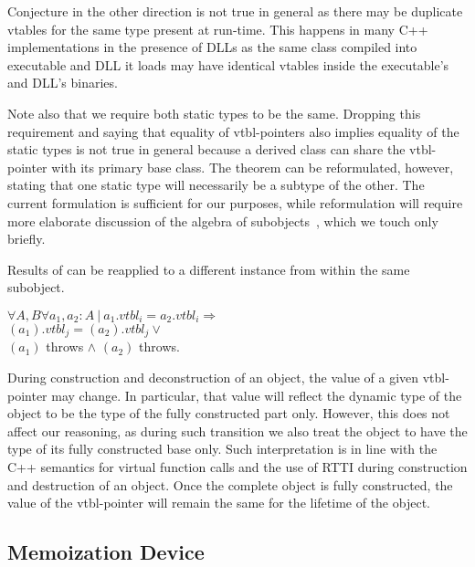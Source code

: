 \noindent
Conjecture in the other direction is not true in general as there may be 
duplicate vtables for the same type present at run-time. This happens in 
many C++ implementations in the presence of DLLs as the same class compiled into 
executable and DLL it loads may have identical vtables inside the 
executable's and DLL's binaries.

Note also that we require both static types to be the same. Dropping this 
requirement and saying that equality of vtbl-pointers also implies equality of 
the static types is not true in general because a derived class can share the 
vtbl-pointer with its primary base class. The theorem 
can be reformulated, however, stating that one static type will necessarily be a 
subtype of the other. The current formulation is sufficient for our purposes, 
while reformulation will require more elaborate discussion of the algebra 
of subobjects~\cite{RDL11}, which we touch only briefly.

\begin{corollary}
Results of  can be reapplied to a different instance from 
within the same subobject. 

$\forall A,B \forall a_1, a_2 : A\ |\ a_1.\textit{vtbl}_i = a_2.\textit{vtbl}_i \Rightarrow$ \\
$(a_1).\textit{vtbl}_j = $$(a_2).\textit{vtbl}_j \vee$ \\
$(a_1)$ throws $\wedge$ $(a_2)$ throws.
\label{crl:vtbl}
\end{corollary}

\noindent
During construction and deconstruction of 
an object, the value of a given vtbl-pointer may change. In particular, 
that value will reflect the dynamic type of the object to be the type of the 
fully constructed part only. However, this does not affect our reasoning, as during 
such transition we also treat the object to have the type of its fully 
constructed base only. Such interpretation is in line with the C++ semantics for 
virtual function calls and the use of RTTI during construction and destruction of an 
object. Once the complete object is fully constructed, the value of the 
vtbl-pointer will remain the same for the lifetime of the object.

\subsection{Memoization Device}
\label{sec:memdev}

